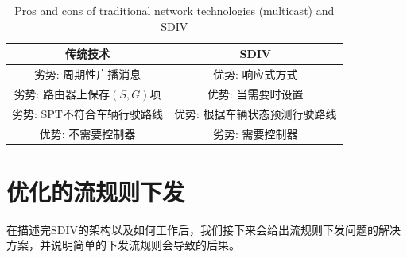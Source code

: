 
\begin{table}[t]
 \caption{\label{table1}Pros and cons of traditional network technologies (multicast) and SDIV}
 \centering
 \begin{tabular}{c|c}
  \hline
  传统技术 & SDIV \\
  \hline
  \hline
  劣势: 周期性广播消息 & 优势: 响应式方式 \\
 \hline
 劣势: 路由器上保存$(S,G)$项& 优势: 当需要时设置 \\
 \hline
 劣势: SPT不符合车辆行驶路线 & 优势: 根据车辆状态预测行驶路线\\
  \hline
  优势: 不需要控制器 & 劣势: 需要控制器 \\
  \hline
 \end{tabular}
\end{table}

\section{优化的流规则下发}

在描述完SDIV的架构以及如何工作后，我们接下来会给出流规则下发问题的解决方案，并说明简单的下发流规则会导致的后果。


